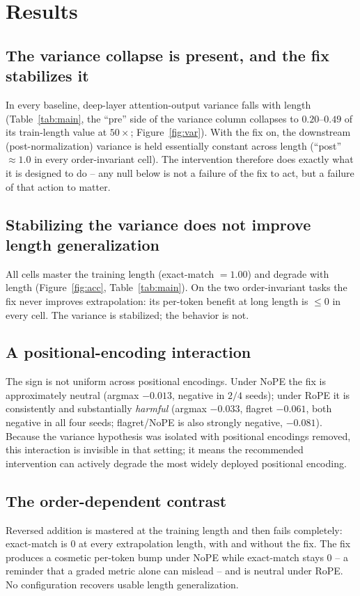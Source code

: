 \documentclass[11pt]{article}
\begin{document}
\section{Results}

\subsection{The variance collapse is present, and the fix stabilizes it}
In every baseline, deep-layer attention-output variance falls with length (Table~\ref{tab:main}, the
``pre'' side of the variance column collapses to $0.20$--$0.49$ of its train-length value at $50\times$;
Figure~\ref{fig:var}). With the fix on, the downstream (post-normalization) variance is held essentially
constant across length (``post'' $\approx 1.0$ in every order-invariant cell). The intervention therefore
does exactly what it is designed to do -- any null below is not a failure of the fix to act, but a failure
of that action to matter.

\subsection{Stabilizing the variance does not improve length generalization}
All cells master the training length (exact-match $=1.00$) and degrade with length
(Figure~\ref{fig:acc}, Table~\ref{tab:main}). On the two order-invariant tasks the fix never improves
extrapolation: its per-token benefit at long length is $\le 0$ in every cell. The variance is stabilized;
the behavior is not.

\subsection{A positional-encoding interaction}
The sign is not uniform across positional encodings. Under NoPE the fix is approximately neutral (argmax
$-0.013$, negative in $2/4$ seeds); under RoPE it is consistently and substantially \emph{harmful}
(argmax $-0.033$, flagret $-0.061$, both negative in all four seeds; flagret/NoPE is also
strongly negative, $-0.081$). Because the variance hypothesis was isolated with positional encodings
removed, this interaction is invisible in that setting; it means the recommended intervention can
actively degrade the most widely deployed positional encoding.

\subsection{The order-dependent contrast}
Reversed addition is mastered at the training length and then fails completely: exact-match is $0$ at
every extrapolation length, with and without the fix. The fix produces a cosmetic per-token bump under
NoPE while exact-match stays $0$ -- a reminder that a graded metric alone can mislead -- and is neutral
under RoPE. No configuration recovers usable length generalization.
\end{document}
